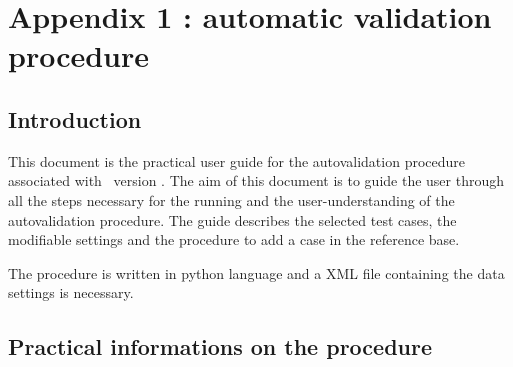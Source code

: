 %
%
% 
%
% 
% 
% 
%
\section{Appendix 1 : automatic validation procedure}
\label{prg_autovalid}
\subsection{Introduction}

This document is the practical user guide for the autovalidation
procedure associated with \CS\ version \verscs.
The aim of this document is to guide the user through all the steps
necessary for the running and the user-understanding of the autovalidation
procedure.
The guide describes the selected test cases, the modifiable settings
and the procedure to add a case in the reference base.

The procedure is written in python language and a XML file containing the
data settings is necessary. 

\subsection{Practical informations on the procedure} 

